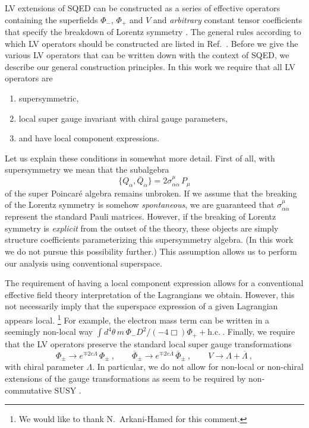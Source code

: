 \documentclass[12pt]{revtex4}
\begin{document}
LV extensions of SQED can be constructed as a series of effective
operators containing the superfields $\Phi_-$, $\Phi_+$ and $V$ and
{\em arbitrary} constant tensor coefficients that specify the
breakdown of Lorentz symmetry \cite{GrootNibbelink:2004za}. 
The general rules according to which LV operators should be
constructed are listed in Ref.\ \cite{MP:}. Before we give the various
LV operators that can be written down with the context of SQED, we
describe our general construction principles. In this work we require
that all LV operators are  
\begin{enumerate}
\item supersymmetric, 
\item local super gauge invariant with chiral gauge parameters, 
\item and have local component expressions. 
\end{enumerate}
Let us explain these conditions in somewhat more detail. First of all,
with supersymmetry we mean that the subalgebra 
\begin{equation}
\{ Q_\alpha, \overline{Q}_{\dot\alpha} \} = 
2 \sigma^\mu_{\alpha\dot{\alpha}} \, P_\mu
\end{equation}
of the super Poincar\'e algebra remains unbroken. If we assume that 
the breaking of the Lorentz symmetry is somehow 
{\em spontaneous}, we are guaranteed that
$\sigma^\mu_{\alpha\dot{\alpha}}$ represent the standard Pauli
matrices. However, if the breaking of Lorentz symmetry is {\em
explicit} from the outset of the theory, these objects are simply 
structure coefficients parameterizing this supersymmetry algebra. (In
this work we do not pursue this possibility further.) This assumption
allows us to perform our analysis using conventional superspace. 


The requirement of having a local component expression allows for a
conventional effective field theory interpretation of the Lagrangians
we obtain. However, this not necessarily imply that the superspace
expression of a given Lagrangian appears local. \footnote{We would 
like to thank N.\ Arkani-Hamed for this comment.} For example, the
electron mass term can be written in a seemingly non-local way  
\(
\int d^4 \theta\, m \, \Phi_- D^2/(- 4\Box) \Phi_+ + \text{h.c.}~.
\)
%
Finally, we require that the LV operators preserve the standard local
super gauge transformations  
\begin{equation}
\Phi_\pm \rightarrow e^{\mp 2 e \Lambda} \, \Phi_\pm~, 
\qquad 
\overline{\Phi}_\pm \rightarrow e^{\mp 2 e \overline{\Lambda}} \, 
\overline{\Phi}_\pm~, 
\qquad 
V \rightarrow \Lambda + \overline{\Lambda}~, 
\label{Gauge}
\end{equation} 
with chiral parameter $\Lambda$. In particular, we do not allow for
non-local or non-chiral extensions of the gauge transformations as
seem to be required by non-commutative SUSY
\cite{Putz:2002ib,Mikulovic:2003sq}.  
\end{document}
